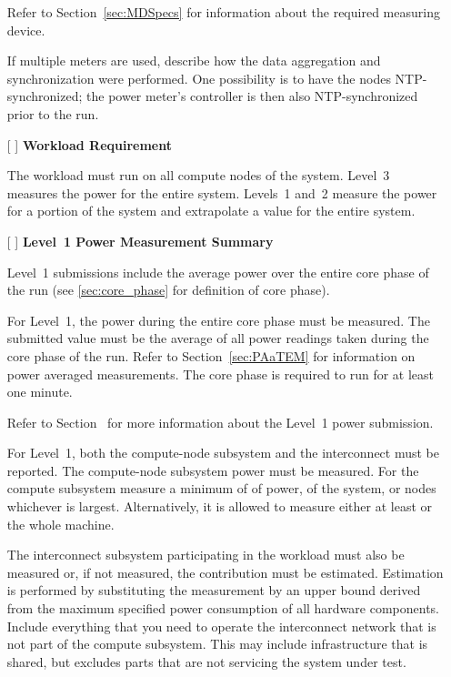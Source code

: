 \begin{itemize}
Refer to Section~\ref{sec:MDSpecs} for information about the required measuring device.

If multiple meters are used, describe how the data aggregation and synchronization were performed.
One possibility is to have the nodes NTP-synchronized; the power meter's controller is then also NTP-synchronized prior to the run.

\item[{[ ]}]
\textbf{Workload Requirement}

The workload must run on all compute nodes of the system.
Level~3 measures the power for the entire system.
Levels~1 and~2 measure the power for a portion of the system and extrapolate a value for the entire system.

\item[{[ ]}]
\textbf{Level~1 Power Measurement Summary}

Level~1 submissions include the average power over the entire core phase of the run (see \ref{sec:core_phase} for definition of core phase).

For Level~1, the power during the entire core phase must be measured.
The submitted value must be the average of all power readings taken during the core phase of the run.
Refer to Section~\ref{sec:PAaTEM} for information on power averaged measurements.
The core phase is required to run for at least one minute.

Refer to Section~ for more information about the Level~1 power submission.

For Level~1, both the compute-node subsystem and the interconnect must be reported.
The compute-node subsystem power must be measured.
For the compute subsystem measure a minimum of \SpecPowerMinLOne{} of power, \SpecFracMinLOne{} of the system, or \SpecMinNodes{} nodes whichever is largest.
Alternatively, it is allowed to measure either at least \SpecPowerMaxLOne{} or the whole machine.

The interconnect subsystem participating in the workload must also be measured or, if not measured, the contribution must be estimated.
Estimation is performed by substituting the measurement by an upper bound derived from the maximum specified power consumption of all hardware components.
Include everything that you need to operate the interconnect network that is not part of the compute subsystem.
This may include infrastructure that is shared, but excludes parts that are not servicing the system under test.


\end{itemize}
